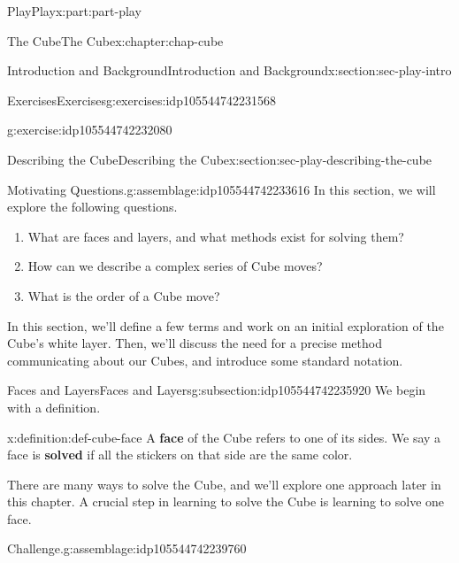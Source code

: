 \documentclass[oneside,10pt,]{book}
\newcommand{\terminology}[1]{\textbf{#1}}
\numberwithin{equation}{section}
\begin{document}
\begin{partptx}{Play}{}{Play}{}{}{x:part:part-play}
\begin{chapterptx}{The Cube}{}{The Cube}{}{}{x:chapter:chap-cube}
\begin{sectionptx}{Introduction and Background}{}{Introduction and Background}{}{}{x:section:sec-play-intro}
\begin{exercises-subsection}{Exercises}{}{Exercises}{}{}{g:exercises:idp105544742231568}
\begin{divisionexercise}{1}{}{}{g:exercise:idp105544742232080}
\end{divisionexercise}%
\end{exercises-subsection}
\end{sectionptx}
%
%
\typeout{************************************************}
\typeout{************************************************}
%
\begin{sectionptx}{Describing the Cube}{}{Describing the Cube}{}{}{x:section:sec-play-describing-the-cube}
\begin{assemblage}{Motivating Questions.}{g:assemblage:idp105544742233616}%
In this section, we will explore the following questions. %
\begin{enumerate}
\item{}What are faces and layers, and what methods exist for solving them?%
\item{}How can we describe a complex series of Cube moves?%
\item{}What is the order of a Cube move?%
\end{enumerate}
%
\end{assemblage}
\begin{introduction}{}%
In this section, we'll define a few terms and work on an initial exploration of the Cube's white layer. Then, we'll discuss the need for a precise method communicating about our Cubes, and introduce some standard notation.%
\end{introduction}%
%
%
\typeout{************************************************}
\typeout{************************************************}
%
\begin{subsectionptx}{Faces and Layers}{}{Faces and Layers}{}{}{g:subsection:idp105544742235920}
We begin with a definition.%
\begin{definition}{}{x:definition:def-cube-face}%
%
%
%
A \terminology{face} of the Cube refers to one of its sides. We say a face is \terminology{solved} if all the stickers on that side are the same color.%
\end{definition}
There are many ways to solve the Cube, and we'll explore one approach later in this chapter. A crucial step in learning to solve the Cube is learning to solve one face.%
\begin{assemblage}{Challenge.}{g:assemblage:idp105544742239760}%

\end{assemblage}
\end{subsectionptx}
\end{sectionptx}
\end{chapterptx}
\end{partptx}
\end{document}
